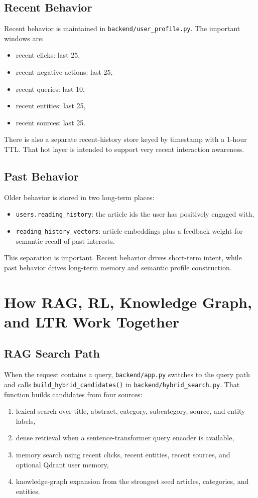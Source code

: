 \documentclass[12pt]{article}
\begin{document}
\subsection{Recent Behavior}
Recent behavior is maintained in \texttt{backend/user\_profile.py}. The important windows are:
\begin{itemize}[leftmargin=1.5em]
  \item recent clicks: last 25,
  \item recent negative actions: last 25,
  \item recent queries: last 10,
  \item recent entities: last 25,
  \item recent sources: last 25.
\end{itemize}

There is also a separate recent-history store keyed by timestamp with a 1-hour TTL. That hot layer is intended to support very recent interaction awareness.

\subsection{Past Behavior}
Older behavior is stored in two long-term places:
\begin{itemize}[leftmargin=1.5em]
  \item \texttt{users.reading\_history}: the article ids the user has positively engaged with,
  \item \texttt{reading\_history\_vectors}: article embeddings plus a feedback weight for semantic recall of past interests.
\end{itemize}

This separation is important. Recent behavior drives short-term intent, while past behavior drives long-term memory and semantic profile construction.

\section{How RAG, RL, Knowledge Graph, and LTR Work Together}
\subsection{RAG Search Path}
When the request contains a query, \texttt{backend/app.py} switches to the query path and calls \texttt{build\_hybrid\_candidates()} in \texttt{backend/hybrid\_search.py}. That function builds candidates from four sources:
\begin{enumerate}[leftmargin=1.5em]
  \item lexical search over title, abstract, category, subcategory, source, and entity labels,
  \item dense retrieval when a sentence-transformer query encoder is available,
  \item memory search using recent clicks, recent entities, recent sources, and optional Qdrant user memory,
  \item knowledge-graph expansion from the strongest seed articles, categories, and entities.
\end{enumerate}
\end{document}
